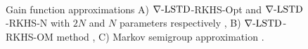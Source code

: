 \begin{figure}[htbp]
	\centering
	\mbox{
	}
	\mbox{
	}
	\mbox{
	}
	\caption[Performance comparison of $\gradTD$-RKHS algorithms for $d=2,5,10$]{Gain function approximations A) $\gradTD$-RKHS-Opt and $\gradTD$-RKHS-N with $2N$ and $N$ parameters respectively \cite{radmey18a}, B) $\gradTD$-RKHS-OM method \cite{radmey19}, C) Markov semigroup approximation \cite{tagmeh16}.}
	\label{fig:diff_td_rkhs_coif_d2510}
\end{figure}

